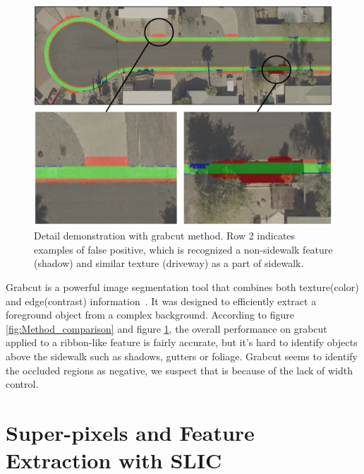 \begin{figure}[H]
    \centering
    \includegraphics[width=\textwidth]{Figures/grabcut_sample.png}
    \caption[Example of Grabcut]{Detail demonstration with grabcut method. Row 2 indicates examples of false positive, which is recognized a non-sidewalk feature (shadow) and similar texture (driveway) as a part of sidewalk.}
    \label{fig:grabcut}
\end{figure}

Grabcut is a powerful image segmentation tool that combines both texture(color) and edge(contrast) information~\cite{Rother2004-ou}. 
It was designed to efficiently extract a foreground object from a complex background. 
According to figure \ref{fig:Method_comparison} and figure \ref{fig:grabcut}, the overall performance on grabcut applied to a ribbon-like feature is fairly accurate, but it's hard to identify objects above the sidewalk such as shadows, gutters or foliage. 
Grabcut seems to identify the occluded regions as negative, we suspect that is because of the lack of width control.

\section {Super-pixels and Feature Extraction with SLIC}

